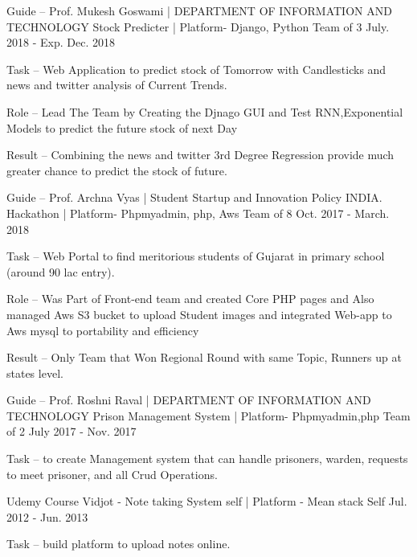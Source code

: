 \begin{cventries}
  \cventry
    {Guide – Prof. Mukesh Goswami | DEPARTMENT OF INFORMATION AND TECHNOLOGY}
    {Stock Predicter | Platform- Django, Python}
    {Team of 3}
    {July. 2018 - Exp. Dec. 2018}
    {
      \begin{cvitems}
        \item {Task – Web Application to predict stock of Tomorrow with Candlesticks and news and twitter analysis of Current Trends.}
        \item {Role –  Lead The Team by Creating the Djnago GUI and Test RNN,Exponential Models to predict the future stock of next Day}
        \item {Result –  Combining the news and twitter 3rd Degree Regression provide much greater chance to predict the stock of future.}
      \end{cvitems}
    }
  \cventry
    {Guide – Prof. Archna Vyas | Student Startup and Innovation Policy INDIA. }
    {Hackathon | Platform- Phpmyadmin, php, Aws}
    {Team of 8}
    {Oct. 2017 - March. 2018}
    {
      \begin{cvitems}
        \item {Task – Web Portal to find meritorious students of Gujarat in primary school (around 90 lac entry).}
        \item {Role – Was Part of Front-end team and created Core PHP pages and Also managed Aws S3 bucket to upload Student images and integrated  Web-app to Aws mysql to portability and efficiency}
        \item {Result – Only Team that Won Regional Round with same Topic, Runners up at states level.}
        \end{cvitems}
    }
  \cventry
    {Guide – Prof. Roshni Raval | DEPARTMENT OF INFORMATION AND TECHNOLOGY}
    {Prison Management System | Platform- Phpmyadmin,php}
    {Team of 2}
    {July 2017 - Nov. 2017}
    {
      \begin{cvitems}
        \item {Task – to create Management system that can handle prisoners, warden, requests to meet prisoner, and all Crud Operations.}
      \end{cvitems} 
    }
  \cventry
    {Udemy Course}
    {Vidjot - Note taking System  self | Platform - Mean stack}
    {Self}
    {Jul. 2012 - Jun. 2013}
    {
      \begin{cvitems}
                \item {Task – build platform to upload notes online.}

\end{cvitems}}
\end{cventries}

